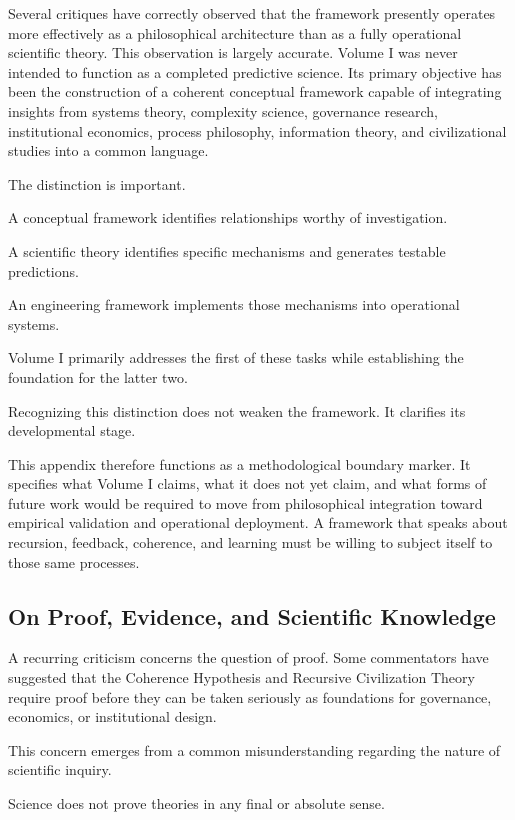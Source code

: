 \documentclass[12pt]{article}
\begin{document}
Several critiques have correctly observed that the framework presently operates more effectively as a philosophical architecture than as a fully operational scientific theory. This observation is largely accurate. Volume I was never intended to function as a completed predictive science. Its primary objective has been the construction of a coherent conceptual framework capable of integrating insights from systems theory, complexity science, governance research, institutional economics, process philosophy, information theory, and civilizational studies into a common language.

The distinction is important.

A conceptual framework identifies relationships worthy of investigation.

A scientific theory identifies specific mechanisms and generates testable predictions.

An engineering framework implements those mechanisms into operational systems.

Volume I primarily addresses the first of these tasks while establishing the foundation for the latter two.

Recognizing this distinction does not weaken the framework. It clarifies its developmental stage.

This appendix therefore functions as a methodological boundary marker. It specifies what Volume I claims, what it does not yet claim, and what forms of future work would be required to move from philosophical integration toward empirical validation and operational deployment. A framework that speaks about recursion, feedback, coherence, and learning must be willing to subject itself to those same processes.

\subsection{On Proof, Evidence, and Scientific Knowledge}

A recurring criticism concerns the question of proof. Some commentators have suggested that the Coherence Hypothesis and Recursive Civilization Theory require proof before they can be taken seriously as foundations for governance, economics, or institutional design.

This concern emerges from a common misunderstanding regarding the nature of scientific inquiry.

Science does not prove theories in any final or absolute sense.
\end{document}
